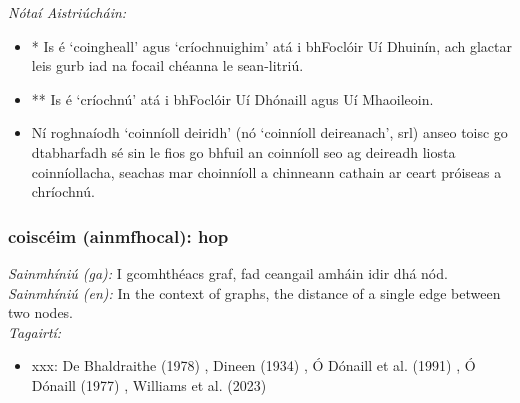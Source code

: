  \noindent \textit{Nótaí Aistriúcháin:}
\begin{itemize}
	\item * Is é `coingheall' agus `críochnuighim' atá i bhFoclóir Uí Dhuinín, ach glactar leis gurb iad na focail chéanna le sean-litriú.
	\item ** Is é `críochnú' atá i bhFoclóir Uí Dhónaill agus Uí Mhaoileoin.
	\item Ní roghnaíodh `coinníoll deiridh' (nó `coinníoll deireanach', srl) anseo toisc go dtabharfadh sé sin le fios go bhfuil an coinníoll seo ag deireadh liosta coinníollacha, seachas mar choinníoll a chinneann cathain ar ceart próiseas a chríochnú.
\end{itemize}


\subsubsection*{coiscéim (ainmfhocal): hop}
 \noindent \textit{Sainmhíniú (ga):} I gcomhthéacs graf, fad ceangail amháin idir dhá nód.
\\
 \noindent \textit{Sainmhíniú (en):} In the context of graphs, the distance of a single edge between two nodes.
\\
 \noindent \textit{Tagairtí:}
\begin{itemize}
	\item xxx: De Bhaldraithe (1978) \cite{de-bhaldraithe}, Dineen (1934) \cite{dineen}, Ó Dónaill et al. (1991) \cite{focloir-beag}, Ó Dónaill (1977) \cite{odonaill}, Williams et al. (2023) \cite{storchiste}
\end{itemize}

